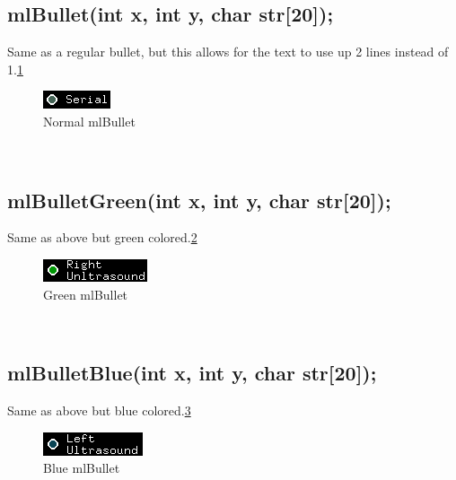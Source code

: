 \documentclass{article}
\begin{document}
\subsection{mlBullet(int x, int y, char str[20]);}
Same as a regular bullet, but this allows for the text to use up 2 lines instead of 1.\ref{mlbullet}\\
\begin{figure}[htp]
  \begin{center}
\includegraphics[]{mlbullet}
  \end{center}
  \caption{Normal mlBullet}
\label{mlbullet}
\end{figure}\\

\subsection{mlBulletGreen(int x, int y, char str[20]);}
Same as above but green colored.\ref{mlbulletgreen}\\
\begin{figure}[htp]
  \begin{center}
\includegraphics[]{mlbulletgreen}
  \end{center}
  \caption{Green mlBullet}
\label{mlbulletgreen}
\end{figure}\\

\subsection{mlBulletBlue(int x, int y, char str[20]);}
Same as above but blue colored.\ref{mlbulletblue}\\
\begin{figure}[htp]
  \begin{center}
\includegraphics[]{mlbulletblue}
  \end{center}
  \caption{Blue mlBullet}
\label{mlbulletblue}
\end{figure}\\
\end{document}
